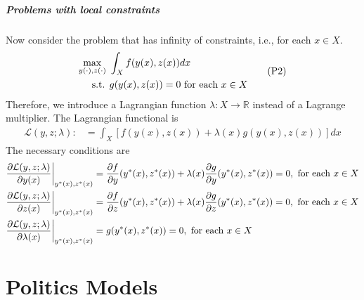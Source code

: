\documentclass[11pt]{elegantbook}
\begin{document}
\paragraph*{Problems with local constraints}
Now consider the problem that has infinity of constraints, i.e., for each $x\in X$.
\begin{equation}
    \begin{aligned}
        \max_{y(\cdot),z(\cdot)}\ &\int_X f(y(x),z(x))dx\\
        \textnormal{s.t. }& g(y(x),z(x))=0 \textnormal{ for each }x\in X
    \end{aligned}
    \label{P2}
    \tag{P2}
\end{equation}
Therefore, we introduce a Lagrangian function $\lambda: X \rightarrow \mathbb{R}$ instead of a Lagrange multiplier. The Lagrangian functional is
\begin{equation}
    \begin{aligned}
        \mathcal{L}(y,z;\lambda):&=\int_X \left[f(y(x),z(x))+\lambda(x)g(y(x),z(x))\right]dx
    \end{aligned}
    \nonumber
\end{equation}
The necessary conditions are
\begin{equation}
    \begin{aligned}
        \frac{\partial \mathcal{L}(y,z;\lambda)}{\partial y(x)}\bigg|_{y^*(x),z^*(x)}&=\frac{\partial f}{\partial y}(y^*(x),z^*(x)) +\lambda(x) \frac{\partial g}{\partial y}(y^*(x),z^*(x))=0, \textnormal{ for each }x\in X\\
        \frac{\partial \mathcal{L}(y,z;\lambda)}{\partial z(x)}\bigg|_{y^*(x),z^*(x)}&=\frac{\partial f}{\partial z}(y^*(x),z^*(x)) +\lambda(x) \frac{\partial g}{\partial z}(y^*(x),z^*(x))=0, \textnormal{ for each }x\in X\\
        \frac{\partial \mathcal{L}(y,z;\lambda)}{\partial \lambda(x)}\bigg|_{y^*(x),z^*(x)}&=g(y^*(x),z^*(x))=0, \textnormal{ for each }x\in X
    \end{aligned}
    \nonumber
\end{equation}









\chapter{Politics Models}
\end{document}

